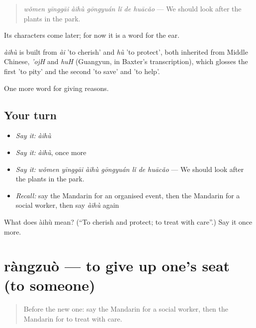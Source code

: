\begin{quote}
\emph{wǒmen yīnggāi àihù gōngyuán lǐ de huācǎo} — We should look after the plants in the park.
\end{quote}

Its characters come later; for now it is a word for the ear.

\begin{cousinweb}
\emph{àihù} is built from \emph{ài} 'to cherish' and \emph{hù} 'to protect', both inherited from Middle Chinese, \emph{'ojH} and \emph{huH} (Guangyun, in Baxter's transcription), which glosses the first 'to pity' and the second 'to save' and 'to help'.
\end{cousinweb}

\begin{grammarlens}[title={What you've built}]
One more word for giving reasons.
\end{grammarlens}

\subsection*{Your turn}
\begin{itemize}
\raggedright
  \item \emph{Say it:} \emph{àihù}
  \item \emph{Say it:} \emph{àihù}, once more
  \item \emph{Say it:} \emph{wǒmen yīnggāi àihù gōngyuán lǐ de huācǎo} — We should look after the plants in the park.
  \item \emph{Recall:} say the Mandarin for an organised event, then the Mandarin for a social worker, then say \emph{àihù} again
\end{itemize}

\begin{tcolorbox}[breakable,colback=teal!4,colframe=teal!35!black,title={Before you move on}]
What does àihù mean? (\textquotedblleft{}To cherish and protect; to treat with care\textquotedblright{}.) Say it once more.
\end{tcolorbox}
\section[ràngzuò]{ràngzuò — to give up one's seat (to someone)}

\label{lesson:ZH-C376-rangzuo}



\begin{quote}
Before the new one: say the Mandarin for a social worker, then the Mandarin for to treat with care.
\end{quote}

